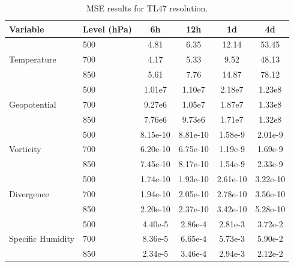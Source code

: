 \begin{table}[ht]
\centering
\small
\label{tab:MSE_47}
\begin{tabular}{llcccc}
\hline
\textbf{Variable} & \textbf{Level (hPa)} & \textbf{6h} & \textbf{12h} & \textbf{1d} & \textbf{4d} \\
\hline\hline

\multirow{3}{*}{Temperature}
    & 500 & 4.81 & 6.35 & 12.14 & 53.45 \\
    & 700 & 4.17 & 5.33 & 9.52 & 48.13 \\
    & 850 & 5.61 & 7.76 & 14.87 & 78.12 \\ 
\hline

\multirow{3}{*}{Geopotential}
    & 500 & 1.01e7 & 1.10e7 & 2.18e7 & 1.23e8 \\
    & 700 & 9.27e6 & 1.05e7 & 1.87e7 & 1.33e8 \\
    & 850 & 7.76e6 & 9.73e6 & 1.71e7 & 1.32e8 \\ 
\hline

\multirow{3}{*}{Vorticity}
    & 500 & 8.15e-10 & 8.81e-10 & 1.58e-9 & 2.01e-9 \\
    & 700 & 6.20e-10 & 6.75e-10 & 1.19e-9 & 1.69e-9 \\
    & 850 & 7.45e-10 & 8.17e-10 & 1.54e-9 & 2.33e-9 \\ 
\hline

\multirow{3}{*}{Divergence}
    & 500 & 1.74e-10 & 1.93e-10 & 2.61e-10 & 3.22e-10 \\
    & 700 & 1.94e-10 & 2.05e-10 & 2.78e-10 & 3.56e-10 \\
    & 850 & 2.20e-10 & 2.37e-10 & 3.42e-10 & 5.28e-10 \\ 
\hline

\multirow{3}{*}{Specific Humidity}
    & 500 & 4.40e-5 & 2.86e-4 & 2.81e-3 & 3.72e-2 \\
    & 700 & 8.36e-5 & 6.65e-4 & 5.73e-3 & 5.90e-2 \\
    & 850 & 2.34e-5 & 3.46e-4 & 2.94e-3 & 2.12e-2 \\ 
\hline

\end{tabular}
\caption{MSE results for TL47 resolution.}
\end{table}


